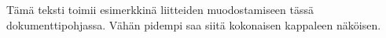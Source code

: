 Tämä teksti toimii esimerkkinä liitteiden muodostamiseen tässä dokumenttipohjassa. Vähän pidempi saa siitä kokonaisen kappaleen näköisen.